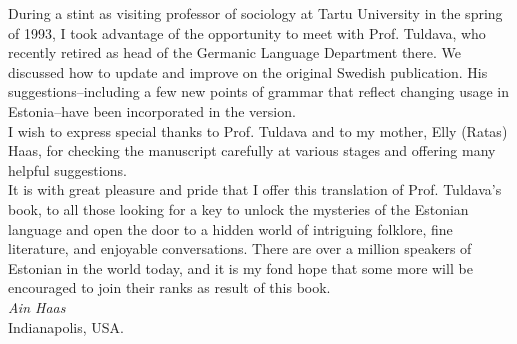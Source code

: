 During a stint as visiting professor of sociology at Tartu University in the spring of 1993, I took advantage of the opportunity to meet with Prof. Tuldava, who recently retired as head of the Germanic Language Department there. We discussed how to update and improve on the original Swedish publication. His suggestions--including a few new points of grammar that reflect changing usage in Estonia--have been incorporated in the version.\\

I wish to express special thanks to Prof. Tuldava and to my mother, Elly (Ratas) Haas, for checking the manuscript carefully at various stages and offering many helpful suggestions.\\

It is with great pleasure and pride that I offer this translation of Prof. Tuldava's book, to all those looking for a key to unlock the mysteries of the Estonian language and open the door to a hidden world of intriguing folklore, fine literature, and enjoyable conversations. There are over a million speakers of Estonian in the world today, and it is my fond hope that some more will be encouraged to join their ranks as result of this book.\\

\textit{Ain Haas}\\
Indianapolis, USA.